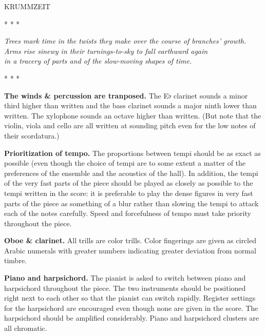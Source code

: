 \begin{center}
\huge KRUMMZEIT
\end{center}

\begin{center}
* * *
\end{center}

\begin{center}
\textit{Trees mark time in the
twists they make over the course of branches' growth.\\
Arms rise sinewy in their turnings-to-sky to fall earthward again \\
in a tracery of parts and of the slow-moving shapes of time. }
\end{center}

\begin{center}
* * *
\end{center}

\textbf{The winds \& percussion are tranposed.} The E$\flat$ clarinet sounds a
minor third higher than written and the bass clarinet sounds a major ninth
lower than written. The xylophone sounds an octave higher than written. (But
note that the violin, viola and cello are all written at sounding pitch even
for the low notes of their scordatura.)

\textbf{Prioritization of tempo.} The proportions between tempi should be as
exact as possible (even though the choice of tempi are to some extent a matter
of the preferences of the ensemble and the acoustics of the hall). In addition,
the tempi of the very fast parts of the piece should be played as closely as
possible to the tempi written in the score: it is preferable to play the dense
figures in very fast parts of the piece as something of a blur rather than
slowing the tempi to attack each of the notes carefully. Speed and forcefulness
of tempo must take priority throughout the piece.

\textbf{Oboe \& clarinet.} All trills are color trills. Color fingerings are
given as circled Arabic numerals with greater numbers indicating greater
deviation from normal timbre.

\textbf{Piano and harpsichord.} The pianist is asked to switch between piano
and harpsichord throughout the piece. The two instruments should be positioned
right next to each other so that the pianist can switch rapidly. Register
settings for the harpsichord are encouraged even though none are given in the
score. The harpsichord should be amplified considerably. Piano and harpsichord
clusters are all chromatic.

